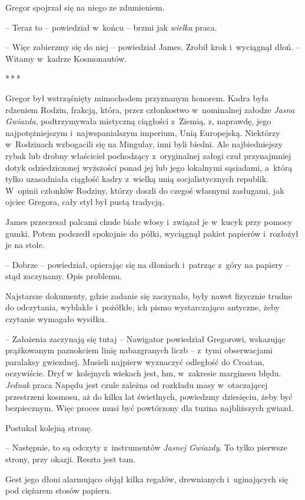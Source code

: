 \documentclass[oneside,polish,12pt,sfheadings]{mwbk}
\newcommand{\threeast}{\bigskip\par\centerline{*\,*\,*}\medskip\par}%
\begin{document}
Gregor spojrzał się na niego ze zdumieniem. 

-- Teraz to -- powiedział w~końcu -- brzmi jak \emph{wielka }praca.

-- Więc zabierzmy się do niej -- powiedział James. Zrobił krok i~wyciągnął
dłoń. -- Witamy w~kadrze Kosmonautów.

\threeast

Gregor był wstrząśnięty mimochodem przyznanym honorem. Kadra była
rdzeniem Rodzin, frakcją, która, przez członkostwo w~nominalnej załodze
\emph{Jasna Gwiazda}, podtrzymywała mistyczną ciągłości z~Ziemią, z,
naprawdę, jego najpotężniejszym i~najwspanialszym imperium, Unią
Europejską. Niektórzy w~Rodzinach wzbogacili się na Mingulay, inni byli
biedni. Ale najbiedniejszy rybak lub drobny właściciel pochodzący z~oryginalnej załogi czuł przynajmniej dotyk odziedziczonej wyższości
ponad jej lub jego lokalnymi sąsiadami, a~którą tylko uzasadniała
ciągłość kadry z~wielką unią socjalistycznych republik. W~opinii
członków Rodziny, którzy doszli do czegoś własnymi zasługami, jak ojciec
Gregora, cały styl był pustą tradycją.

James przeczesał palcami chude białe włosy i~związał je w~kucyk przy
pomocy gumki. Potem podszedł spokojnie do półki, wyciągnął pakiet
papierów i~rozłożył je na stole.

-- Dobrze -- powiedział, opierając się na dłoniach i~patrząc z~góry na
papiery -- stąd zaczynamy. Opis problemu.

Najstarsze dokumenty, gdzie zadanie się zaczynało, były nawet fizycznie
trudne do odczytania, wyblakłe i~pożółkłe, ich pismo wystarczająco
antyczne, żeby czytanie wymagało wysiłku.

-- Założenia zaczynają się tutaj -- Nawigator powiedział Gregorowi,
wskazując prążkowanym paznokciem linię nabazgranych liczb -- z~tymi
obserwacjami paralaksy gwiezdnej. Musieli najpierw wyznaczyć odległość
do Croatan, oczywiście. Dryf w~kolejnych wiekach jest, hm, w~zakresie
marginesu błędu. \emph{Jednak } praca Napędu jest czule zależna od
rozkładu masy w~otaczającej przestrzeni kosmosu, aż do kilku lat
świetlnych, powiedzmy dziesięciu, żeby być bezpiecznym. Więc proces musi
być powtórzony dla tuzina najbliższych gwiazd.

Postukał kolejną stronę.

-- Następnie, to są odczyty z~instrumentów \emph{Jasnej Gwiazdy}. To
tylko pierwsze strony, przy okazji. Reszta jest tam.

Gest jego dłoni alarmująco objął kilka regałów, drewnianych i~uginających się pod ciężarem stosów papieru.
\end{document}
